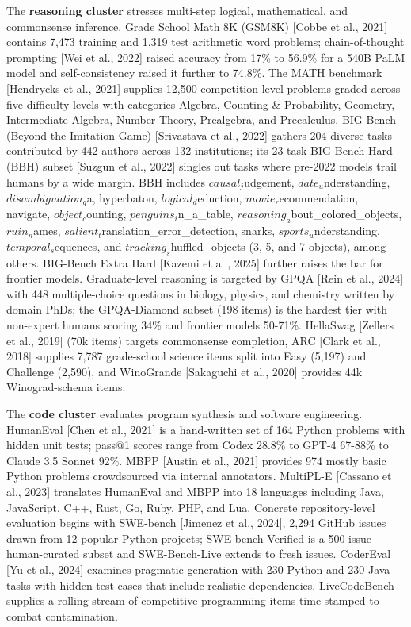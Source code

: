 The \textbf{reasoning cluster} stresses multi-step logical, mathematical, and commonsense inference. Grade School Math 8K (GSM8K) {[}Cobbe et al., 2021{]} contains 7,473 training and 1,319 test arithmetic word problems; chain-of-thought prompting {[}Wei et al., 2022{]} raised accuracy from 17\% to 56.9\% for a 540B PaLM model and self-consistency raised it further to 74.8\%. The MATH benchmark {[}Hendrycks et al., 2021{]} supplies 12,500 competition-level problems graded across five difficulty levels with categories Algebra, Counting \& Probability, Geometry, Intermediate Algebra, Number Theory, Prealgebra, and Precalculus. BIG-Bench (Beyond the Imitation Game) {[}Srivastava et al., 2022{]} gathers 204 diverse tasks contributed by 442 authors across 132 institutions; its 23-task BIG-Bench Hard (BBH) subset {[}Suzgun et al., 2022{]} singles out tasks where pre-2022 models trail humans by a wide margin. BBH includes \(causal_j\)udgement, \(date_u\)nderstanding, \(disambiguation_q\)a, hyperbaton, \(logical_d\)eduction, \(movie_r\)ecommendation, navigate, \(object_c\)ounting, \(penguins_i\)n\_a\_table, \(reasoning_a\)bout\_colored\_objects, \(ruin_n\)ames, \(salient_t\)ranslation\_error\_detection, snarks, \(sports_u\)nderstanding, \(temporal_s\)equences, and \(tracking_s\)huffled\_objects (3, 5, and 7 objects), among others. BIG-Bench Extra Hard {[}Kazemi et al., 2025{]} further raises the bar for frontier models. Graduate-level reasoning is targeted by GPQA {[}Rein et al., 2024{]} with 448 multiple-choice questions in biology, physics, and chemistry written by domain PhDs; the GPQA-Diamond subset (198 items) is the hardest tier with non-expert humans scoring 34\% and frontier models 50-71\%. HellaSwag {[}Zellers et al., 2019{]} (70k items) targets commonsense completion, ARC {[}Clark et al., 2018{]} supplies 7,787 grade-school science items split into Easy (5,197) and Challenge (2,590), and WinoGrande {[}Sakaguchi et al., 2020{]} provides 44k Winograd-schema items.

The \textbf{code cluster} evaluates program synthesis and software engineering. HumanEval {[}Chen et al., 2021{]} is a hand-written set of 164 Python problems with hidden unit tests; pass@1 scores range from Codex 28.8\% to GPT-4 67-88\% to Claude 3.5 Sonnet 92\%. MBPP {[}Austin et al., 2021{]} provides 974 mostly basic Python problems crowdsourced via internal annotators. MultiPL-E {[}Cassano et al., 2023{]} translates HumanEval and MBPP into 18 languages including Java, JavaScript, C++, Rust, Go, Ruby, PHP, and Lua. Concrete repository-level evaluation begins with SWE-bench {[}Jimenez et al., 2024{]}, 2,294 GitHub issues drawn from 12 popular Python projects; SWE-bench Verified is a 500-issue human-curated subset and SWE-Bench-Live extends to fresh issues. CoderEval {[}Yu et al., 2024{]} examines pragmatic generation with 230 Python and 230 Java tasks with hidden test cases that include realistic dependencies. LiveCodeBench supplies a rolling stream of competitive-programming items time-stamped to combat contamination.

